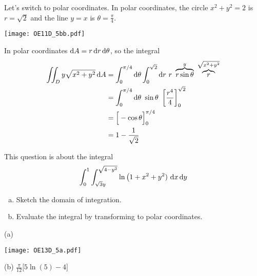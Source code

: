 \begin{solution}
 Let's switch to polar coordinates. In polar coordinates,
the circle $x^2+y^2=2$ is $r=\sqrt{2}$ and the line $y=x$ is
$\theta=\frac{\pi}{4}$.
\begin{center}
     \texttt{[image: OE11D\_5bb.pdf]}\qquad
\end{center}
In polar coordinates $\mathrm{d}A = r\,\mathrm{d}r\,\mathrm{d}\theta$, so the integral
\begin{align*}
\dblInt_D y\sqrt{x^2+y^2}\,\dee{A}
&=\int_0^{\pi/4}\dee{\theta}\int_0^{\sqrt{2}}\dee{r}\ r\  
 \overbrace{r\sin\theta}^{y}\ \overbrace{r}^{\sqrt{x^2+y^2}} \\
&=\int_0^{\pi/4}\dee{\theta}\ \sin\theta\ 
     \left[\frac{r^4}{4}\right]_0^{\sqrt{2}} \\
&=\Big[-\cos\theta\Big]_0^{\pi/4} \\
&= 1-\frac{1}{\sqrt{2}}
\end{align*}
\end{solution}

\begin{question}[M200 2013D] %
This question is about the integral
\begin{equation*}
\int_0^1 \int_{\sqrt{3}y}^{\sqrt{4-y^2}} \ln\big(1+x^2+y^2)\
                         \mathrm{d}x\,\mathrm{d}y
\end{equation*}
\begin{enumerate}[(a)]
\item
Sketch the domain of integration.
\item
Evaluate the integral by transforming to polar coordinates.
\end{enumerate}
\end{question}

%

\begin{answer}
(a)
\begin{center}
     \texttt{[image: OE13D\_5a.pdf]}
\end{center}

(b) $\frac{\pi}{12}\big[5\ln(5)-4\big]$
\end{answer}

